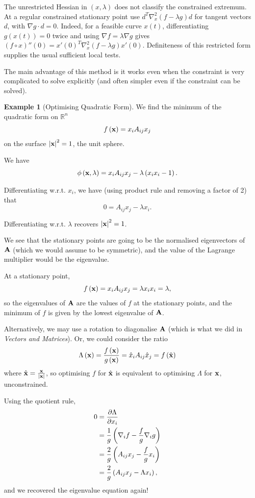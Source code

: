 \documentclass[11pt]{article}
\numberwithin{equation}{section}
\theoremstyle{definition}
\newtheorem{example}[theorem]{Example}
\theoremstyle{remark}
\newcommand{\pqty}[1]{\left(#1\right)}
\newcommand{\abs}[1]{\left|#1\right|}
\newcommand{\flatfrac}[2]{\frac{#1}{#2}}
\newcommand{\RR}{\mathbb{R}}
\begin{document}
The unrestricted Hessian in \((x,\lambda)\) does not classify the constrained
extremum. At a regular constrained stationary point use
\(d^T\nabla_x^2(f-\lambda g)d\) for tangent vectors \(d\), with
\(\nabla g\cdot d=0\). Indeed, for a feasible curve \(x(t)\), differentiating
\(g(x(t))=0\) twice and using \(\nabla f=\lambda\nabla g\) gives
\((f\circ x)''(0)=x'(0)^T\nabla_x^2(f-\lambda g)x'(0)\).
Definiteness of this restricted form supplies the usual sufficient local tests.

The main advantage of this method is it works even when the constraint is very complicated to solve explicitly (and often simpler even if the constraint can be solved).

\begin{example}[Optimising Quadratic Form]\label{variation-unit-0038}
    \label{ex:optimising-quadratic-form}%
    We find the minimum of the quadratic form on \(\RR^n\)
    \[
        f\pqty{\vb{x}} = x_i A_{ij} x_j
    \]
    on the surface \(\abs{\vb{x}}^2 = 1\), the unit sphere.

    We have
    \[
        \phi\pqty{\vb{x}, \lambda} = x_i A_{ij} x_j - \lambda \pqty{x_i x_i - 1}.
    \]

    Differentiating w.r.t. \(x_i\), we have (using product rule and removing a factor of 2) that
    \[
        0 = A_{ij} x_j - \lambda x_i.
    \]

    Differentiating w.r.t. \(\lambda\) recovers \(\abs{\vb{x}}^2 = 1\).

    We see that the stationary points are going to be the normalised eigenvectors of \(\vb{A}\) (which we would assume to be symmetric), and the value of the Lagrange multiplier would be the eigenvalue.

    At a stationary point,
    \[
        f\pqty{\vb{x}} = x_i A_{ij} x_j = \lambda x_i x_i = \lambda,
    \]
    so the eigenvalues of \(\vb{A}\) are the values of \(f\) at the stationary points, and the minimum of \(f\) is given by the lowest eigenvalue of \(\vb{A}\).

    Alternatively, we may use a rotation to diagonalise \(\vb{A}\) (which is what we did in \textit{Vectors and Matrices}). Or, we could consider the ratio
    \[
        \Lambda\pqty{\vb{x}} = \frac{f\pqty{\vb{x}}}{g\pqty{\vb{x}}} = \hat{x}_i A_{ij} \hat{x}_j = f\pqty{\hat{\vb{x}}}
    \]
    where \(\hat{\vb{x}} = \flatfrac{\vb{x}}{\abs{\vb{x}}}\), so optimising \(f\) for \(\hat{\vb{x}}\) is equivalent to optimising \(\Lambda\) for \(\vb{x}\), unconstrained.

    Using the quotient rule,
    \begin{align*}
        0 &= \pdv{\Lambda}{x_i} \\
        &= \frac{1}{g} \pqty{\nabla_i f - \frac{f}{g} \nabla_i g} \\
        &= \frac{2}{g} \pqty{A_{ij} x_j - \frac{f}{g} x_i} \\
        &= \frac{2}{g} \pqty{A_{ij} x_j - \Lambda x_i},
    \end{align*}
    and we recovered the eigenvalue equation again!
\end{example}
\end{document}
